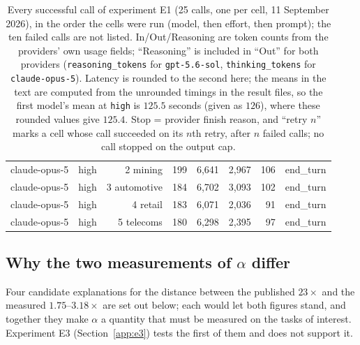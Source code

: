 \documentclass[11pt]{article}
\begin{document}
\begin{table}[p]
\begin{tabular}{llrrrrrl}
claude-opus-5 & high & 2 mining & 199 & 6{,}641 & 2{,}967 & 106 & end\_turn \\
claude-opus-5 & high & 3 automotive & 184 & 6{,}702 & 3{,}093 & 102 & end\_turn \\
claude-opus-5 & high & 4 retail & 183 & 6{,}071 & 2{,}036 & 91 & end\_turn \\
claude-opus-5 & high & 5 telecoms & 180 & 6{,}298 & 2{,}395 & 97 & end\_turn \\
\bottomrule
\end{tabular}
\caption{Every successful call of experiment E1 (25 calls, one per cell, 11 September 2026), in the order the cells were run (model, then effort, then prompt); the ten failed calls are not listed. In/Out/Reasoning are token counts from the providers' own usage fields; ``Reasoning'' is included in ``Out'' for both providers (\texttt{reasoning\_tokens} for \texttt{gpt-5.6-sol}, \texttt{thinking\_tokens} for \texttt{claude-opus-5}). Latency is rounded to the second here; the means in the text are computed from the unrounded timings in the result files, so the first model's mean at \texttt{high} is $125.5$ seconds (given as $126$), where these rounded values give $125.4$. Stop = provider finish reason, and ``retry $n$'' marks a cell whose call succeeded on its $n$th retry, after $n$ failed calls; no call stopped on the output cap.}
\label{tab:e1-calls}
\end{table}

\subsection{Why the two measurements of \texorpdfstring{$\alpha$}{alpha} differ}
\label{app:alpha-why}

Four candidate explanations for the distance between the published $23\times$ and the measured
$1.75$--$3.18\times$ are set out below; each would let both figures stand, and
together they make $\alpha$ a quantity that must be measured on the tasks of interest. Experiment E3 (Section~\ref{app:e3}) tests the first of them and does not support it.
\end{document}
